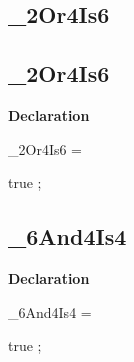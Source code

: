 \documentclass{report}
\newif\ifpdf
\begin{document}
\subsection*{\large{\textbf{{\_}2Or4Is6}}\normalsize\hspace{1ex}\hrulefill}
\else
\subsection*{{\_}2Or4Is6}
\fi
\label{ok_if_expressions_2-_2Or4Is6}
\begin{list}{}{
\setlength{\itemindent}{0cm}
\setlength{\listparindent}{0cm}
\setlength{\leftmargin}{\evensidemargin}
\addtolength{\leftmargin}{\tmplength}
\settowidth{\labelsep}{X}
\addtolength{\leftmargin}{\labelsep}
\setlength{\labelwidth}{\tmplength}
}
\item[\textbf{Declaration}\hfill]
\ifpdf
\begin{flushleft}
\fi
\begin{ttfamily}
{\_}2Or4Is6 =

true
;\end{ttfamily}

\ifpdf
\end{flushleft}
\fi

\end{list}
\ifpdf
\subsection*{\large{\textbf{{\_}6And4Is4}}\normalsize\hspace{1ex}\hrulefill}
\else
\subsection*{{\_}6And4Is4}
\fi
\label{ok_if_expressions_2-_6And4Is4}
\begin{list}{}{
\setlength{\itemindent}{0cm}
\setlength{\listparindent}{0cm}
\setlength{\leftmargin}{\evensidemargin}
\addtolength{\leftmargin}{\tmplength}
\settowidth{\labelsep}{X}
\addtolength{\leftmargin}{\labelsep}
\setlength{\labelwidth}{\tmplength}
}
\item[\textbf{Declaration}\hfill]
\ifpdf
\begin{flushleft}
\fi
\begin{ttfamily}
{\_}6And4Is4 =

true
;\end{ttfamily}

\ifpdf
\end{flushleft}
\fi

\end{list}
\ifpdf
\end{document}
